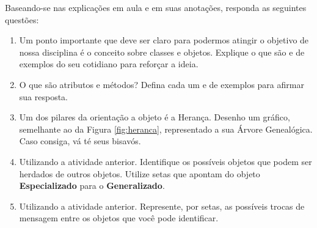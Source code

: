   Baseando-se nas explicações em aula e em suas anotações, responda as seguintes questões:

  \begin{enumerate}
  	\item   Um ponto importante que deve ser claro para podermos atingir o objetivo de nossa disciplina é o conceito sobre classes e objetos. Explique o que são e de exemplos do seu cotidiano para reforçar a ideia.
  	\item O que são atributos e métodos? Defina cada um e de exemplos para afirmar sua resposta.
  	\item Um dos pilares da orientação a objeto é a Herança. Desenho um gráfico, semelhante ao da Figura \ref{fig:heranca}, representado a sua Árvore Genealógica. Caso consiga, vá té seus bisavós. 
  	\item Utilizando a atividade anterior. Identifique os possíveis objetos que podem ser herdados de outros objetos. Utilize setas que apontam do objeto \textbf{Especializado} para o \textbf{Generalizado}. 
  	\item Utilizando a atividade anterior. Represente, por setas, as possíveis trocas de mensagem entre os objetos que você pode identificar. 
  \end{enumerate}
  



  

  



